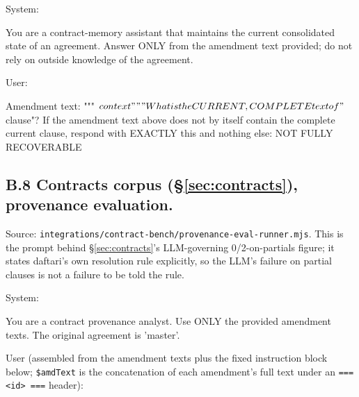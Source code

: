 \documentclass[11pt]{article}
\begin{document}
System:
\begin{promptverb}
You are a contract-memory assistant that maintains the current consolidated state of an agreement. Answer ONLY from the amendment text provided; do not rely on outside knowledge of the agreement.
\end{promptverb}

User:
\begin{promptverb}
Amendment text:
"""
${context}
"""

What is the CURRENT, COMPLETE text of "${clause}"? If the amendment text above does not by itself contain the complete current clause, respond with EXACTLY this and nothing else: NOT FULLY RECOVERABLE
\end{promptverb}

\subsection*{B.8 Contracts corpus (\S\ref{sec:contracts}), provenance evaluation.}
Source: \texttt{integrations/contract-bench/provenance-eval-runner.mjs}. This is the prompt behind
\S\ref{sec:contracts}'s LLM-governing 0/2-on-partials figure; it states daftari's own resolution rule
explicitly, so the LLM's failure on partial clauses is not a failure to be told the rule.

System:
\begin{promptverb}
You are a contract provenance analyst. Use ONLY the provided amendment texts. The original agreement is 'master'.
\end{promptverb}

User (assembled from the amendment texts plus the fixed instruction block below; \texttt{\${amdText}}
is the concatenation of each amendment's full text under an \texttt{=== <id> ===} header):
\end{document}
